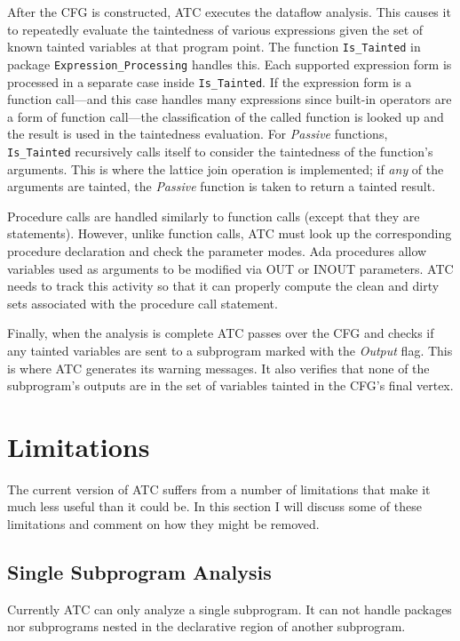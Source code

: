 \documentclass{article}
\begin{document}
After the CFG is constructed, ATC executes the dataflow analysis. This causes it to repeatedly evaluate the taintedness of various expressions given the set of known tainted variables at that program point. The function \texttt{Is\_Tainted} in package \texttt{Expression\_Processing} handles this. Each supported expression form is processed in a separate case inside \texttt{Is\_Tainted}. If the expression form is a function call---and this case handles many expressions since built-in operators are a form of function call---the classification of the called function is looked up and the result is used in the taintedness evaluation. For \textit{Passive} functions, \texttt{Is\_Tainted} recursively calls itself to consider the taintedness of the function's arguments. This is where the lattice join operation is implemented; if \emph{any} of the arguments are tainted, the \textit{Passive} function is taken to return a tainted result.

Procedure calls are handled similarly to function calls (except that they are statements). However, unlike function calls, ATC must look up the corresponding procedure declaration and check the parameter modes. Ada procedures allow variables used as arguments to be modified via OUT or INOUT parameters. ATC needs to track this activity so that it can properly compute the clean and dirty sets associated with the procedure call statement.

Finally, when the analysis is complete ATC passes over the CFG and checks if any tainted variables are sent to a subprogram marked with the \textit{Output} flag. This is where ATC generates its warning messages. It also verifies that none of the subprogram's outputs are in the set of variables tainted in the CFG's final vertex.

\section{Limitations}

The current version of ATC suffers from a number of limitations that make it much less useful than it could be. In this section I will discuss some of these limitations and comment on how they might be removed.

\subsection{Single Subprogram Analysis}

Currently ATC can only analyze a single subprogram. It can not handle packages nor subprograms nested in the declarative region of another subprogram.
\end{document}
